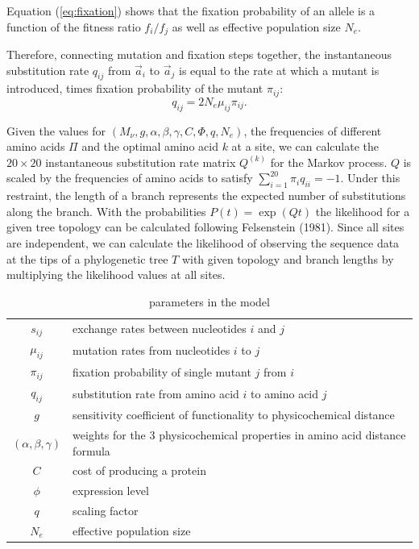 \documentclass[13pt]{article}
\newcommand{\avec}{\ensuremath{\vec{a}}\xspace}
\begin{document}
Equation (\ref{eq:fixation}) shows that the fixation probability of an allele is a function of the fitness ratio $f_i/f_j$ as well as effective population size $N_e$.


Therefore, connecting mutation and fixation steps together, the instantaneous substitution rate $q_{ij}$ from $\avec_i$ to $\avec_j$ is equal to the rate at which a mutant is introduced,  times fixation probability of the mutant $\pi_{ij}$:
\begin{equation}
q_{ij} = 2N_e \mu_{ij} \pi_{ij}.
\label{eq:subrate}
\end{equation}


Given the values for $\left(M_{\nu},g, \alpha, \beta, \gamma, C, \Phi, q, N_e\right)$, the frequencies of different amino acids $\Pi$ and the optimal amino acid $k$ at a site, we can calculate the $20 \times 20$ instantaneous substitution rate matrix $Q^{(k)}$ for the Markov process. 
$Q$ is scaled by the frequencies of amino acids to satisfy $\sum_{i=1}^{20} \pi_i q_{ii}= -1$.
Under this restraint, the length of a branch represents the expected number of substitutions along the branch.
With the probabilities $P(t)  = \exp\left(Q t\right)$ the likelihood for a given tree topology can be calculated following Felsenstein (1981).
Since all sites are independent, we can calculate the likelihood of observing the sequence data at the tips of a phylogenetic tree $T$ with given topology and branch lengths by multiplying the likelihood values at all sites.\\

\begin{table}[h]
\centering
\caption{parameters in the model}
\begin{tabular}{ c p{10cm} }
\hline
$s_{ij}$ & exchange rates between nucleotides $i$ and $j$ \\
$\mu_{ij}$ & mutation rates from nucleotides $i$ to $j$\\
$\pi_{ij}$ & fixation probability of single mutant $j$ from $i$\\
$q_{ij}$ & substitution rate from amino acid $i$ to amino acid $j$\\
$g$       & sensitivity coefficient of functionality to physicochemical distance \\
$(\alpha,\beta,\gamma)$ & weights for the 3 physicochemical properties in amino acid distance formula \\
$C$ & cost of producing a protein\\
$\phi$ & expression level \\
$q$ & scaling factor \\
$N_e$ & effective population size \\
\hline
\end{tabular}

\label{tb: para}
\end{table}
\end{document}

